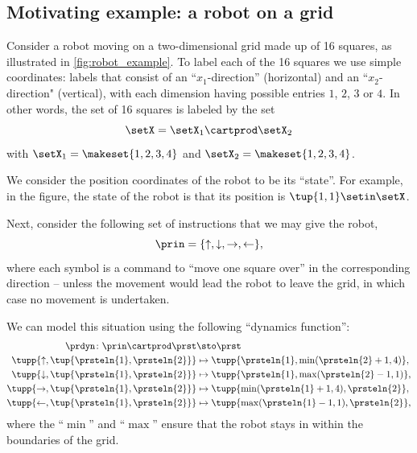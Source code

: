    
\subsection{Motivating example: a robot on a grid}
   
    Consider a robot moving on a two-dimensional grid made up of 16 squares, as illustrated in \cref{fig:robot_example}. To label each of the 16 squares we use simple coordinates: labels that consist of an ``$x_1$-direction'' (horizontal) and an ``$x_2$-direction" (vertical), with each dimension having possible entries $1$, $2$, $3$ or $4$. In other words, the set of 16 squares is labeled by the set
\begin{equation}
    \setX = \setX_1 \cartprod \setX_2
\end{equation}
with $\setX_1 = \makeset{1, 2, 3, 4}$ and $\setX_2 = \makeset{1, 2, 3, 4}$. 

    \begin{marginfigure}
        \centering
        \caption{Robot on a grid example. }
        \label{fig:robot_example}
    \end{marginfigure}

    We consider the position coordinates of the robot to be its ``state''.  For example, in the figure, the state of the robot is that its position is $\tup{1,1} \setin \setX$. 
    
    
    Next, consider the following set of instructions that we may give the robot,
\begin{equation}
\prin=\{\uparrow, \downarrow,\rightarrow,\leftarrow\},
\end{equation}
where each symbol is a command to ``move one square over'' in the corresponding direction  -- unless the movement would lead the robot to leave the grid, in which case no movement is undertaken. 


We can model this situation using the following  ``dynamics function'': 
    \begin{equation}
        \begin{aligned}
            \prdyn\colon \prin \cartprod \prst                & \sto \prst \\
            \tupp{\uparrow, \tup{\prsteln{1},\prsteln{2}}}    & \mapsto \tupp{\prsteln{1}, \min(\prsteln{2}+1,4)}, \\
            \tupp{\downarrow, \tup{\prsteln{1},\prsteln{2}}}  & \mapsto \tupp{\prsteln{1}, \max(\prsteln{2}-1,1)}, \\
            \tupp{\rightarrow, \tup{\prsteln{1},\prsteln{2}}} & \mapsto \tupp{\min(\prsteln{1}+1,4), \prsteln{2}}, \\
            \tupp{\leftarrow, \tup{\prsteln{1},\prsteln{2}}}  & \mapsto \tupp{\max(\prsteln{1}-1,1), \prsteln{2}}, \\
        \end{aligned}
    \end{equation}
    where the ``$\min$'' and ``$\max$'' ensure that the robot stays in within the boundaries of the grid.
    
